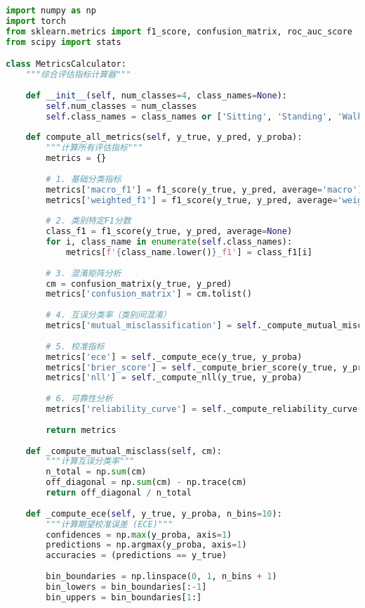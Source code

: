 \begin{lstlisting}[language=Python,caption=综合评估指标实现]
import numpy as np
import torch
from sklearn.metrics import f1_score, confusion_matrix, roc_auc_score
from scipy import stats

class MetricsCalculator:
    """综合评估指标计算器"""
    
    def __init__(self, num_classes=4, class_names=None):
        self.num_classes = num_classes
        self.class_names = class_names or ['Sitting', 'Standing', 'Walking', 'Falling']
    
    def compute_all_metrics(self, y_true, y_pred, y_proba):
        """计算所有评估指标"""
        metrics = {}
        
        # 1. 基础分类指标
        metrics['macro_f1'] = f1_score(y_true, y_pred, average='macro')
        metrics['weighted_f1'] = f1_score(y_true, y_pred, average='weighted')
        
        # 2. 类别特定F1分数
        class_f1 = f1_score(y_true, y_pred, average=None)
        for i, class_name in enumerate(self.class_names):
            metrics[f'{class_name.lower()}_f1'] = class_f1[i]
        
        # 3. 混淆矩阵分析
        cm = confusion_matrix(y_true, y_pred)
        metrics['confusion_matrix'] = cm.tolist()
        
        # 4. 互误分类率（类别间混淆）
        metrics['mutual_misclassification'] = self._compute_mutual_misclass(cm)
        
        # 5. 校准指标
        metrics['ece'] = self._compute_ece(y_true, y_proba)
        metrics['brier_score'] = self._compute_brier_score(y_true, y_proba)
        metrics['nll'] = self._compute_nll(y_true, y_proba)
        
        # 6. 可靠性分析
        metrics['reliability_curve'] = self._compute_reliability_curve(y_true, y_proba)
        
        return metrics
    
    def _compute_mutual_misclass(self, cm):
        """计算互误分类率"""
        n_total = np.sum(cm)
        off_diagonal = np.sum(cm) - np.trace(cm)
        return off_diagonal / n_total
    
    def _compute_ece(self, y_true, y_proba, n_bins=10):
        """计算期望校准误差 (ECE)"""
        confidences = np.max(y_proba, axis=1)
        predictions = np.argmax(y_proba, axis=1)
        accuracies = (predictions == y_true)
        
        bin_boundaries = np.linspace(0, 1, n_bins + 1)
        bin_lowers = bin_boundaries[:-1]
        bin_uppers = bin_boundaries[1:]
        

\end{lstlisting}
